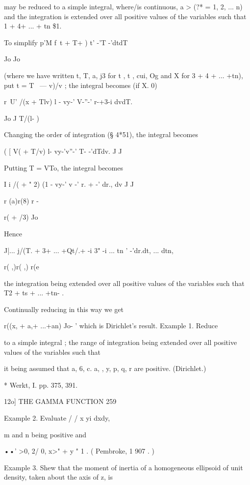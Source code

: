 may be reduced to a simple integral, where/is continuous, a  > (?* = 1, 2, ... n) 
and the integration is extended over all positive values of the variables such 
that  1 + 4+ ... + tn \$1. 

To simplify p'M  f\ t + T+ ) t' -'T -'dtdT 

Jo Jo 

(where we have written t, T, a, j3 for t , t , cui, Og and X for  3 +  4 + ... +tn), 
put t = T  \ — v)/v ; the integral becomes (if X.   0) 

r~U' /(x + Tlv) l - vy-' V-''-' r-+3-i dvdT. 

Jo J T/(l- )  

Changing the order of integration (§ 4*51), the integral becomes 

( [   V(  + T/v) l- vy-'v''-' T- -'dTdv. 
J J 

Putting T = VTo, the integral becomes 

I i /(  + " 2) (1 - vy-' v -' r. + -' dr., dv 
J J 

r (a)r(8) r -  



r(  + /3) Jo 

Hence 



  J|... j/(T. +  3+ ... +Qt/.+  -i 3" -i ... tn ' -'dr.dt, ... dtn, 



r( ,)r( ,) 
r(e 

the integration being extended over all positive values of the variables such 
that T2 + ts + ... +tn- . 

Continually reducing in this way we get 

r((x, + a,+ ...+an) Jo-  ' 
which is Dirichlet's result. 
Example 1. Reduce 

to a simple integral ; the range of integration being extended over all positive values 
of the variables such that 

it being assumed that a, 6, c. a,  , y, p, q, r are positive. (Dirichlet.) 

* Werkt, I. pp. 375, 391. 



12o] THE GAMMA FUNCTION 259 

Example 2. Evaluate / / x yi dxdy, 

m and n being positive and 

••' >0, 2/ 0, x>" + y "   1 . ( Pembroke, 1 907 . ) 

Example 3. Shew that the moment of inertia of a homogeneous ellipsoid of unit 
density, taken about the axis of z, is 

